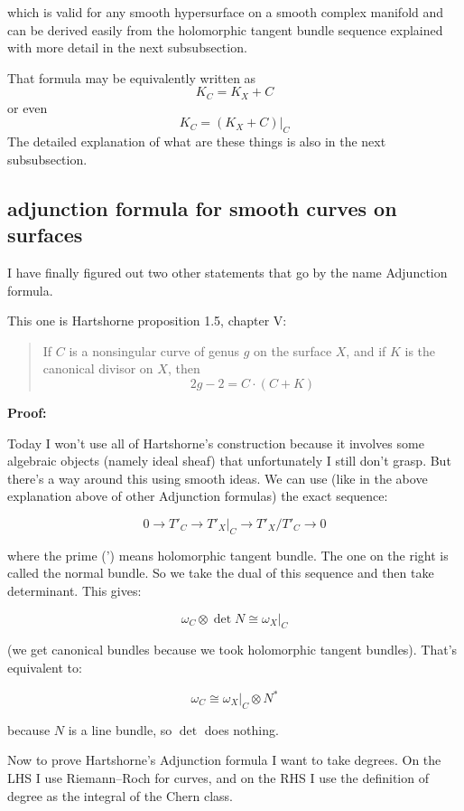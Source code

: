 which is valid for any smooth hypersurface on a smooth complex manifold and can be derived easily from the holomorphic tangent bundle sequence explained with more detail in the next subsubsection.

That formula may be equivalently written as
\[K_C=K_X + C\]
or even
\[K_C = (K_X+C)|_{C}\]
The detailed explanation of what are these things is also in the next subsubsection.

\subsection{adjunction formula for smooth curves on surfaces}

I have finally figured out two other statements that go by the name Adjunction formula.

This one is Hartshorne proposition 1.5, chapter V:

\begin{quote}
If \( C \) is a nonsingular curve of genus \( g \) on the surface \( X \), and if \( K \) is the canonical divisor on \( X \), then
\[
2g - 2 = C \cdot (C + K)
\]
\end{quote}

\textbf{Proof:}

Today I won’t use all of Hartshorne’s construction because it involves some algebraic objects (namely ideal sheaf) that unfortunately I still don’t grasp. But there’s a way around this using smooth ideas. We can use (like in the above explanation above of other Adjunction formulas) the exact sequence:

\[
0 \to T'_C \to T'_X|_C \to T'_X / T'_C \to 0
\]

where the prime (') means holomorphic tangent bundle. The one on the right is called the normal bundle. So we take the dual of this sequence and then take determinant. This gives:

\[
\omega_C \otimes \det N \cong \omega_X|_C
\]

(we get canonical bundles because we took holomorphic tangent bundles). That’s equivalent to:

\[
\omega_C \cong \omega_X|_C \otimes N^*
\]

because \( N \) is a line bundle, so \( \det \) does nothing.

Now to prove Hartshorne’s Adjunction formula I want to take degrees. On the LHS I use Riemann–Roch for curves, and on the RHS I use the definition of degree as the integral of the Chern class.

